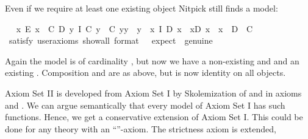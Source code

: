 \begin{isabellebody}
%
\begin{isamarkuptext}%
Even if we require at least one existing object Nitpick still finds a model:%
\end{isamarkuptext}\isamarkuptrue%
\ \isamarkupfalse%
\ {\isachardoublequoteopen}{\isacharparenleft}{\isasymexists}x{\isachardot}\ E\ x{\isacharparenright}\ \isactrlbold {\isasymand}\ {\isacharparenleft}{\isasymexists}C\ D{\isachardot}\ {\isacharparenleft}\isactrlbold {\isasymforall}y{\isachardot}\ I\ {\isacharparenleft}C\ y{\isacharparenright}\ \isactrlbold {\isasymand}\ {\isacharparenleft}C\ y{\isacharparenright}{\isasymcdot}y\ {\isasymcong}\ y{\isacharparenright}\ \isactrlbold {\isasymand}\ {\isacharparenleft}\isactrlbold {\isasymforall}x{\isachardot}\ I\ {\isacharparenleft}D\ x{\isacharparenright}\ \isactrlbold {\isasymand}\ x{\isasymcdot}{\isacharparenleft}D\ x{\isacharparenright}\ {\isasymcong}\ x{\isacharparenright}\ \isactrlbold {\isasymand}\ \isactrlbold {\isasymnot}{\isacharparenleft}D\ {\isacharequal}\ C{\isacharparenright}{\isacharparenright}{\isachardoublequoteclose}\isanewline
\ \ \ \isamarkupfalse%
\ {\isacharbrackleft}satisfy{\isacharcomma}\ user{\isacharunderscore}axioms{\isacharcomma}\ show{\isacharunderscore}all{\isacharcomma}\ format\ {\isacharequal}\ {}{\isacharcomma}\ expect\ {\isacharequal}\ genuine{\isacharbrackright}%
\isadelimproof
\ %
\endisadelimproof
%
\isatagproof
{}\isamarkupfalse%
\ \ %
%
\endisatagproof
{\isafoldproof}%
%
\isadelimproof
%
\endisadelimproof
%
\begin{isamarkuptext}%
Again the model is of cardinality , but now we have a non-existing  and 
  and an existing . Composition \isa{{\isasymcdot}} and  are as above, but 
   is now identity on all objects.%
\end{isamarkuptext}\isamarkuptrue%
%
\isamarkuptrue%
%
\begin{isamarkuptext}%
Axiom Set II is developed from Axiom Set I by Skolemization of  and  
 in axioms  and . We can argue semantically that every model of Axiom Set I has such 
 functions. Hence, we get a conservative extension of Axiom Set I. This could be done for any 
 theory with an ``''-axiom. The strictness axiom  is extended, 

\end{isamarkuptext}
\end{isabellebody}
